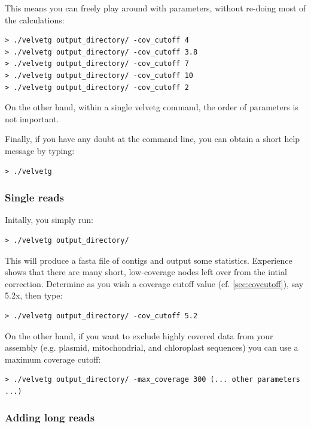 \documentclass{article}
\begin{document}
This means you can freely play around with parameters, without re-doing most of the calculations:

\begin{verbatim}
> ./velvetg output_directory/ -cov_cutoff 4
> ./velvetg output_directory/ -cov_cutoff 3.8
> ./velvetg output_directory/ -cov_cutoff 7
> ./velvetg output_directory/ -cov_cutoff 10
> ./velvetg output_directory/ -cov_cutoff 2
\end{verbatim}

On the other hand, within a single velvetg command, the order of parameters is not important.

Finally, if you have any doubt at the command line, you can obtain a short help message by typing:

\begin{verbatim}
> ./velvetg
\end{verbatim}

	\subsubsection{Single reads}
	
	\label{sec:velvetg}

Initally, you simply run: 
\begin{verbatim}
> ./velvetg output_directory/
\end{verbatim}

This will produce a fasta file of contigs and output some statistics.
Experience shows that there are many short, low-coverage nodes left over from the intial correction. Determine as you wish a coverage cutoff value (cf. \ref{sec:covcutoff}), say 5.2x, then type:

\begin{verbatim}
> ./velvetg output_directory/ -cov_cutoff 5.2
\end{verbatim}

On the other hand, if you want to exclude highly covered data from your assembly (e.g. plasmid, mitochondrial, and chloroplast sequences) you can use a maximum coverage cutoff:

\begin{verbatim}
> ./velvetg output_directory/ -max_coverage 300 (... other parameters ...)
\end{verbatim}

	\subsubsection{Adding long reads}
	
\end{document}
